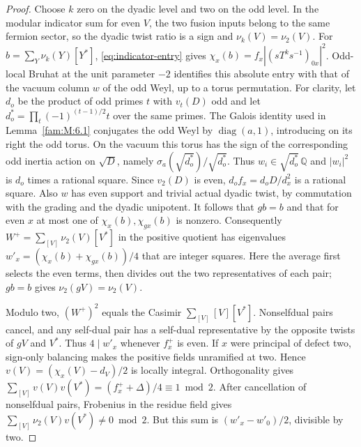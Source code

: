 \documentclass[11pt,a4paper]{article}
\numberwithin{equation}{section}
\theoremstyle{remark}
\newcommand{\QQ}{\mathbb Q}
\begin{document}
\begin{proof}
Choose $k$ zero on the dyadic level and two on the odd level.
In the modular indicator sum for even $V$, the two fusion inputs
belong to the same fermion sector, so the dyadic twist ratio is
a sign and $\nu_k(V)=\nu_2(V)$. For
$b=\sum_Y\nu_k(Y)[Y^*]$, \eqref{eq:indicator-entry} gives
$\chi_x(b)=f_x|(sT^k s^{-1})_{0x}|^2$. Odd-local Bruhat at the
unit parameter $-2$ identifies this absolute entry with that of
the vacuum column $w$ of the odd Weyl, up to a torus permutation.
For clarity, let $d_o$ be the product of odd primes $t$ with
$v_t(D)$ odd and let $d_o^*=\prod_t (-1)^{(t-1)/2}t$ over
the same primes. The Galois identity used in
Lemma~\ref{fam:M:6.1} conjugates the odd Weyl by
$\operatorname{diag}(a,1)$, introducing on its right the odd
torus. On the vacuum this torus has the sign of the corresponding
odd inertia action on $\sqrt D$, namely
$\sigma_a(\sqrt{d_o^*})/\sqrt{d_o^*}$. Thus
$w_i\in\sqrt{d_o^*}\,\QQ$ and $|w_i|^2$ is $d_o$ times a rational square.
Since $v_2(D)$ is even, $d_o f_x=d_oD/d_x^2$ is a rational
square. Also $w$ has even support and trivial actual dyadic twist,
by commutation with the grading and the dyadic unipotent. It
follows that $gb=b$ and that for even $x$ at most one of
$\chi_x(b),\chi_{gx}(b)$ is nonzero. Consequently
$W^+=\sum_{[V]}\nu_2(V)[V^*]$ in the positive quotient has
eigenvalues $w'_x=(\chi_x(b)+\chi_{gx}(b))/4$ that are integer
squares. Here the average first selects the even terms, then
divides out the two representatives of each pair; $gb=b$ gives
$\nu_2(gV)=\nu_2(V)$.

Modulo two, $(W^+)^2$ equals the Casimir
$\sum_{[V]}[V][V^*]$. Nonselfdual pairs cancel, and any
self-dual pair has a self-dual representative by the opposite
twists of $gV$ and $V^*$. Thus $4\mid w'_x$ whenever $f_x^+$
is even. If $x$ were principal of defect two, sign-only balancing
makes the positive fields unramified at two. Hence
$v(V)=(\chi_x(V)-d_V)/2$ is locally integral. Orthogonality
gives $\sum_{[V]}v(V)v(V^*)=(f_x^++\Delta)/4\equiv1\bmod2$.
After cancellation of nonselfdual pairs, Frobenius in the residue
field gives $\sum_{[V]}\nu_2(V)v(V^*)\ne0\bmod2$. But this
sum is $(w'_x-w'_0)/2$, divisible by two.
\end{proof}
\end{document}
